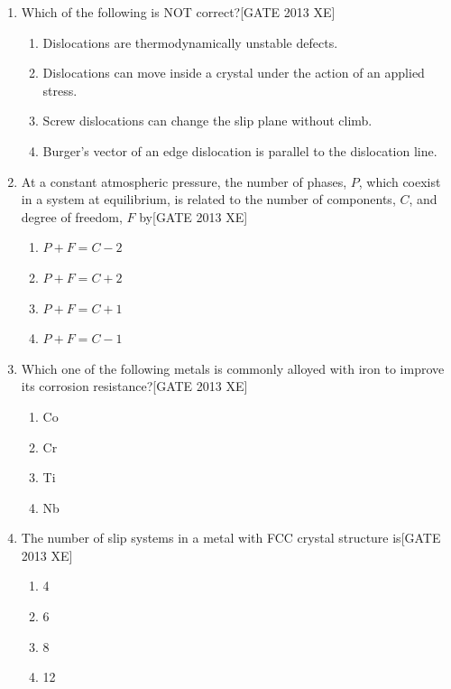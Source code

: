 \documentclass[journal,12pt,onecolumn]{IEEEtran}
\theoremstyle{remark}
\begin{document}
\begin{enumerate}
\item Which of the following is NOT correct?\hfill[GATE 2013 XE]
\begin{multicols}{2}
\begin{enumerate}
\item Dislocations are thermodynamically unstable defects.
\item Dislocations can move inside a crystal under the action of an applied stress.
\item Screw dislocations can change the slip plane without climb.
\item Burger's vector of an edge dislocation is parallel to the dislocation line.
\end{enumerate}
\end{multicols}

\item At a constant atmospheric pressure, the number of phases, $P$, which coexist in a system at equilibrium, is related to the number of components, $C$, and degree of freedom, $F$ by\hfill[GATE 2013 XE]
\begin{multicols}{2}
\begin{enumerate}
\item $P+F=C-2$
\item $P+F=C+2$
\item $P+F=C+1$
\item $P+F=C-1$
\end{enumerate}
\end{multicols}

\item Which one of the following metals is commonly alloyed with iron to improve its corrosion resistance?\hfill[GATE 2013 XE]
\begin{multicols}{2}
\begin{enumerate}
\item Co
\item Cr
\item Ti
\item Nb
\end{enumerate}
\end{multicols}

\item The number of slip systems in a metal with FCC crystal structure is\hfill[GATE 2013 XE]
\begin{multicols}{2}
\begin{enumerate}
\item 4
\item 6
\item 8
\item 12
\end{enumerate}
\end{multicols}


\end{enumerate}
\end{document}

